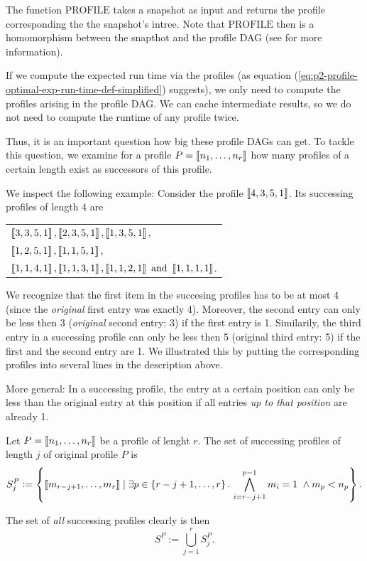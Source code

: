 The function $\text{PROFILE}$ takes a snapshot as input and returns the profile corresponding the the snapshot's intree. Note that $\text{PROFILE}$ then is a homomorphism between the snapthot and the profile DAG (see \cite{hell2004graphs} for more information).

If we compute the expected run time via the profiles (as equation (\ref{eq:p2-profile-optimal-exp-run-time-def-simplified}) suggests), we only need to compute the profiles arising in the profile DAG. We can cache intermediate results, so we do not need to compute the runtime of any profile twice.

Thus, it is an important question how big these profile DAGs can get. To tackle this question, we examine for a profile $P=\left\llbracket n_1,\dots,n_r \right\rrbracket$ how many profiles of a certain length exist as successors of this profile.

We inspect the following example: Consider the profile $\left\llbracket 4,3,5,1 \right\rrbracket$. Its successing profiles of length 4 are
\begin{center}
  \begin{tabular}{l}
    $\left\llbracket 3, 3, 5, 1 \right\rrbracket, \left\llbracket 2, 3, 5, 1 \right\rrbracket, \left\llbracket 1, 3, 5, 1 \right\rrbracket,$ \\
    $\left\llbracket 1, 2, 5, 1 \right\rrbracket, \left\llbracket 1, 1, 5, 1 \right\rrbracket,$ \\
    $\left\llbracket 1, 1, 4, 1 \right\rrbracket,
    \left\llbracket 1, 1, 3, 1 \right\rrbracket,
    \left\llbracket 1, 1, 2, 1 \right\rrbracket \text{ and }
    \left\llbracket 1, 1, 1, 1 \right\rrbracket$.
  \end{tabular}
\end{center}

We recognize that the first item in the succesing profiles has to be at most 4 (since the \emph{original} first entry was exactly 4). Moreover, the second entry can only be less then 3 (\emph{original} second entry: 3) if the first entry is 1. Similarily, the third entry in a successing profile can only be less then 5 (original third entry: 5) if the first and the second entry are 1.
We illustrated this by putting the corresponding profiles into several lines in the description above.

More general: In a successing profile, the entry at a certain position can only be less than the original entry at this position if all entries \emph{up to that position} are already 1.

\begin{definition}
Let $P=\left\llbracket n_1,\dots,n_r \right\rrbracket$ be a profile of lenght $r$. The set of successing profiles of length $j$ of original profile $P$ is
\begin{equation*}
  S^P_{j}
  :=
  \left\{ 
    \left\llbracket m_{r-j+1},\dots,m_{r} \right\rrbracket
    \mid
    \exists p \in \left\{ r-j+1,\dots,r \right\}.\,
    \bigwedge_{i=r-j+1}^{p-1} m_i = 1 \ \wedge m_p < n_p
  \right\}.
\end{equation*}

The set of \emph{all} successing profiles clearly is then
\begin{equation*}
  S^P
  :=
  \bigcup_{j=1}^r S^P_j.
\end{equation*}
\end{definition}

